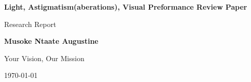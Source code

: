
\begin{titlepage}
    \begin{center}
        \vspace*{1cm}
            
        \Huge
        \textbf{Light, Astigmatism(aberations), Visual Preformance Review Paper        }


        \vspace{0.5cm}
        \LARGE
        Research Report
            
        \vspace{1.5cm}
            
        \textbf{Musoke Ntaate Augustine\\}
            
        \vfill
            
       Your Vision, Our Mission\\
        
            
        \vspace{1.5cm}
        \vfill
            

        \vspace{0.5cm}
        \vfill
        
        \Large
        \today
            
    \end{center}
\end{titlepage}
    